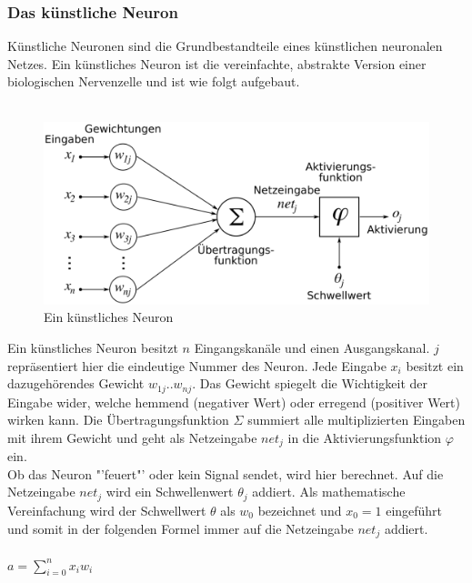 \documentclass[12pt,oneside,a4paper,parskip]{scrbook}
\begin{document}
\subsubsection{Das künstliche Neuron}
Künstliche Neuronen sind die Grundbestandteile eines künstlichen neuronalen Netzes.
Ein künstliches Neuron ist die vereinfachte, abstrakte Version einer biologischen Nervenzelle und ist wie folgt aufgebaut.\\\\
\begin{figure}[h]
	\begin{center}
		\includegraphics[width=12cm]{Bilder/ArtificialNeuronModel_deutsch.png}
		\caption{Ein künstliches Neuron}
		\label{fig:wikiNeuron}
	\end{center}
\end{figure}
Ein künstliches Neuron besitzt $n$ Eingangskanäle und einen Ausgangskanal. $j$ repräsentiert hier die eindeutige Nummer des Neuron. Jede Eingabe $x_{i}$ besitzt ein dazugehörendes Gewicht $w_{1j}..w_{nj}$. Das Gewicht spiegelt die Wichtigkeit der Eingabe wider, welche hemmend (negativer Wert) oder erregend (positiver Wert) wirken kann. Die Übertragungsfunktion $\Sigma$ summiert alle multiplizierten Eingaben mit ihrem Gewicht und geht als Netzeingabe $net_j$ in die Aktivierungsfunktion $\varphi$ ein. \\
Ob das Neuron "'feuert"' oder kein Signal sendet, wird hier berechnet. Auf die Netzeingabe $net_j$ wird ein Schwellenwert $\theta_j$ addiert. Als mathematische Vereinfachung wird der Schwellwert $\theta$ als $w_0$ bezeichnet und $x_0 = 1$ eingeführt und somit in der folgenden Formel immer auf die Netzeingabe $net_j$ addiert.
\\\\
${\displaystyle a=\sum _{i=0}^{n}x_{i}w_{i}}$
\\\\
\end{document}
